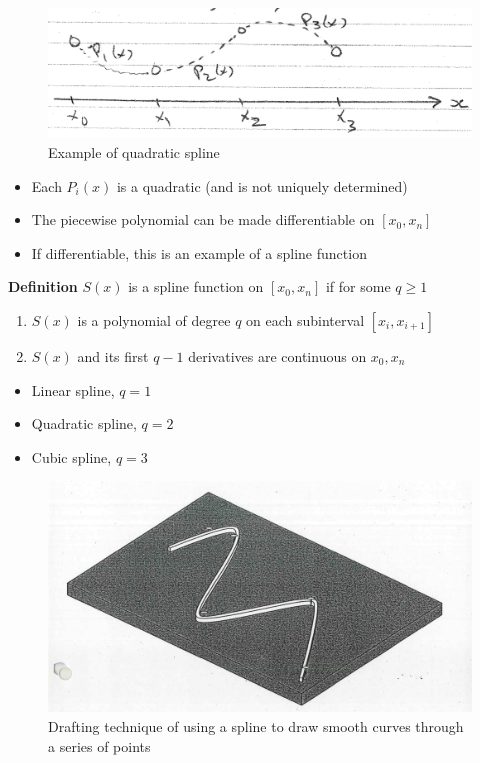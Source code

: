 \documentclass [titlepage,12pt,letter] {article}
\begin{document}
\begin{figure} 
  \centering
  \includegraphics[scale=0.7]{quadratic_splines}
  \caption{Example of quadratic spline}
  \label{fig:linear}
\end{figure}



\begin{itemize} 
\item Each $P_i(x)$ is a quadratic (and is not uniquely determined) 
\item The piecewise polynomial can be made differentiable on $[x_0, x_n]$ 
\item If differentiable, this is an example of a spline function 
\end{itemize}  
\medskip 
\noindent 
{\bf Definition} 
$S(x)$ is a spline function on $[x_0, x_n]$ if for some $q \geq 1$ 
\begin{enumerate} 
\item $S(x)$ is a polynomial of degree $q$ on each subinterval $[x_i, x_{i+1}]$ 
\item $S(x)$ and its first $q-1$ derivatives are continuous on $x_0, x_n$ 
\end{enumerate} 

\begin{itemize} 
\item Linear spline, $q=1$
\item Quadratic spline, $q=2$
\item Cubic spline, $q=3$
\end{itemize} 

\begin{figure} 
  \centering
  \includegraphics[scale=0.4]{physical_splines}
  \caption{Drafting technique of using a spline to draw smooth curves 
through a series of points}
  \label{fig:linear}
\end{figure}
\end{document}
